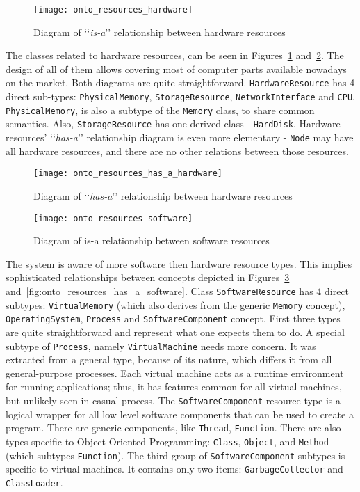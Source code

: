 \begin{figure}[ht]
\centering
\texttt{[image: onto\_resources\_hardware]}
\caption{Diagram of \lq\lq{}\emph{is-a}\rq\rq{} relationship between hardware resources}
\label{fig:onto_resources_hardware}
\end{figure}

The classes related to hardware resources, can be seen in Figures~\ref{fig:onto_resources_hardware} and~\ref{fig:onto_resources_has_a_hardware}. The design of all of them allows covering most of computer parts available nowadays on the market. Both diagrams are quite straightforward. \texttt{HardwareResource} has 4 direct sub-types: \texttt{PhysicalMemory}, \texttt{StorageResource}, \texttt{NetworkInterface} and \texttt{CPU}. \texttt{PhysicalMemory}, is also a subtype of the \texttt{Memory} class, to share common semantics. Also, \texttt{StorageResource} has one derived class - \texttt{HardDisk}. Hardware resources\rq{} \lq\lq{}\emph{has-a}\rq\rq{} relationship diagram is even more elementary - \texttt{Node} may have all hardware resources, and there are no other relations between those resources.

\begin{figure}[ht]
\centering
\texttt{[image: onto\_resources\_has\_a\_hardware]}
\caption{Diagram of \lq\lq{}\emph{has-a}\rq\rq{} relationship between hardware resources}
\label{fig:onto_resources_has_a_hardware}
\end{figure}

\begin{figure}[ht]
\centering
\texttt{[image: onto\_resources\_software]}
\caption{Diagram of is-a relationship between software resources}
\label{fig:onto_resources_software}
\end{figure}

The system is aware of more software then hardware resource types. This implies sophisticated relationships between concepts depicted in Figures~\ref{fig:onto_resources_software} and~\ref{fig:onto_resources_has_a_software}. Class \texttt{SoftwareResource} has 4 direct subtypes: \texttt{VirtualMemory} (which also derives from the generic \texttt{Memory} concept), \texttt{OperatingSystem}, \texttt{Process} and \texttt{SoftwareComponent} concept. First three types are quite straightforward and represent what one expects them to do. A special subtype of \texttt{Process}, namely \texttt{VirtualMachine} needs more concern. It was extracted from a general type, because of its nature, which differs it from all general-purpose processes. Each virtual machine acts as a runtime environment for running applications; thus, it has features common for all virtual machines, but unlikely seen in casual process. The \texttt{SoftwareComponent} resource type is a logical wrapper for all low level software components that can be used to create a program. There are generic components, like \texttt{Thread}, \texttt{Function}. There are also types specific to Object Oriented Programming: \texttt{Class}, \texttt{Object}, and \texttt{Method} (which subtypes \texttt{Function}). The third group of \texttt{SoftwareComponent} subtypes is specific to virtual machines. It contains only two items: \texttt{GarbageCollector} and \texttt{ClassLoader}.

